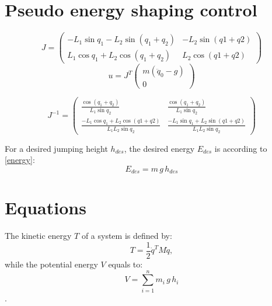 \section{Pseudo energy shaping control}

\begin{equation}
    J = \begin{pmatrix}
    -L_1 \sin{q_1} - L_2 \sin{(q_1+q_2)} & -L_2 \sin{(q1+q2)} \\
    L_1 \cos{q_1} + L_2 \cos{(q_1+q_2)} & L_2 \cos{(q1+q2)}
    \end{pmatrix}
\end{equation}
 \begin{equation}
     u = J^T \begin{pmatrix}
     m (\ddot q_0 - g) \\
     0
     \end{pmatrix}
 \end{equation}
 
 \begin{equation}
     J^{-1} = \begin{pmatrix}
     \frac{\cos (q_1+q_2)}{L_1 \sin q_2} & \frac{\cos (q_1+q_2)}{L_1 \sin q_2} \\
     \frac{-L_1\cos q_1 + L_2 \cos (q1+q2)}{L_1 L_2 \sin q_2} & \frac{-L_1\sin q_1 + L_2 \sin (q1+q2)}{L_1 L_2 \sin q_2}
     \end{pmatrix}
 \end{equation}


For a desired jumping height $h_{des}$, the desired energy $E_{des}$ is according to \autoref{energy}:
\begin{equation}
    E_{des} = m\, g\, h_{des}
\end{equation}

\newpage
\section{Equations}

The kinetic energy $T$ of a system is defined by:
\begin{equation}
    T = \frac{1}{2} \dot q^T M \dot q, 
\end{equation}
while the potential energy $V$ equals to:
\begin{equation}
    V = \sum_{i=1}^{n} m_i\, g \,h_i
\end{equation}.


